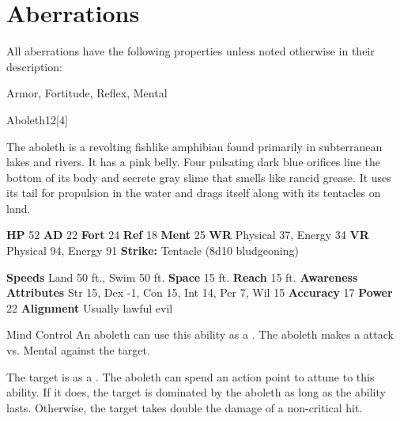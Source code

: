 
        \section{Aberrations}

        All aberrations have the following properties unless noted otherwise in their description:
        
    
     Armor,
     Fortitude,
     Reflex,
     Mental
  
  
      
  \begin{monsection}{Aboleth}{12}[4]
    \vspace{-1em}\vspace{-1em}
    \vspace{0em}

    
    The aboleth is a revolting fishlike amphibian found primarily in subterranean lakes and rivers.
    It has a pink belly.
    Four pulsating dark blue orifices line the bottom of its body and secrete gray slime that smells like rancid grease.
    It uses its tail for propulsion in the water and drags itself along with its tentacles on land.
  
    

    \begin{spellcontent}
      \begin{spelltargetinginfo}
        \pari \textbf{HP} 52 \monsep
          \textbf{AD} 22 \monsep
          \textbf{Fort} 24 \monsep
          \textbf{Ref} 18 \monsep
          \textbf{Ment} 25
        \pari \textbf{WR} Physical 37, Energy 34 \monsep
        \textbf{VR} Physical 94, Energy 91
        \pari \textbf{Strike:}
            Tentacle  (8d10 bludgeoning)
      \end{spelltargetinginfo}
    \end{spellcontent}
    \begin{monsterfooter}
      \pari \textbf{Speeds} Land 50 ft., Swim 50 ft. \monsep
        \textbf{Space} 15 ft. \monsep
        \textbf{Reach} 15 ft.
      \pari \textbf{Awareness} 
      \pari \textbf{Attributes}
        Str 15, Dex -1,
        Con 15, Int 14,
        Per 7, Wil 15
      \pari \textbf{Accuracy} 17 \monsep
        \textbf{Power} 22
      \pari \textbf{Alignment} Usually lawful evil
    \end{monsterfooter}
  \end{monsection}
  \begin{freeability}{Mind Control}
      An aboleth can use this ability as a . The aboleth makes a  attack
        vs. Mental against the target.
    
    \hit The target is  as a .
    \crit 
        The aboleth can spend an action point to attune to this ability.
        If it does, the target is dominated by the aboleth as long as the ability lasts.
        Otherwise, the target takes double the damage of a non-critical hit.
    \end{freeability}
  

